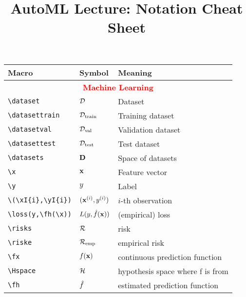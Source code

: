 \documentclass[]{article}
\title{AutoML Lecture: Notation Cheat Sheet}
\author{}
\date{}
\begin{document}
\maketitle

\begin{table}
	\begin{tabular}{lll}
		\toprule
		Macro & Symbol & Meaning \\
		\midrule
		\multicolumn{3}{c}{\textcolor{red}{\textbf{Machine Learning}}}\\
     \verb!\dataset!	& $\mathcal{D}$ & Dataset\\
     \verb!\datasettrain!	& $\mathcal{D}_{\text{train}}$ & Training dataset\\
	   \verb!\datasetval!	& $\mathcal{D}_{\text{val}}$ & Validation dataset\\
     \verb!\datasettest!  & $\mathcal{D}_{\text{test}}$ & Test dataset\\
		 \verb!\datasets!  & $\mathbf{D}$ & Space of datasets\\
     \verb!\x!  & $\mathbf{x}$ & Feature vector \\
     \verb!\y!  & $y$ & Label \\
     \verb!\(\xI{i},\yI{i})! &	$(\mathbf{x}^{(i)},y^{(i)})$ & $i$-th observation\\
		 \verb!\loss(y,\fh(\x))!  & $L(y,\hat{f}(\mathbf{x}))$ & (empirical) loss\\
		 \verb!\risks!  & $\mathcal{R}$ & risk\\
		 \verb!\riske!  & $\mathcal{R}_{\text{emp}}$ & empirical risk\\
		 \verb!\fx!  & $f(\mathbf{x})$ & continuous prediction function \\
		 \verb!\Hspace!  & $\mathcal{H}$ & hypothesis space where f is from \\
		 \verb!\fh!  & $\hat{f}$ & estimated prediction function \\


\end{tabular}
\end{table}
\end{document}
